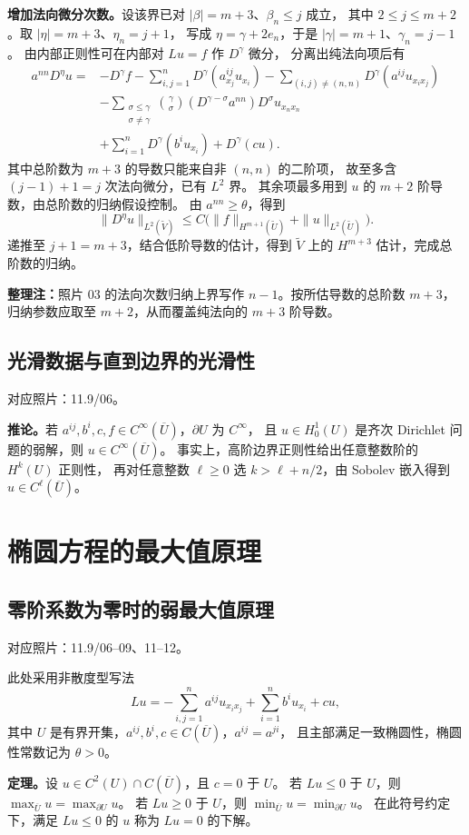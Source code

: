 \documentclass[UTF8,a4paper,11pt,fontset=fandol]{ctexart}
\newcommand{\Ub}{\overline U}
\newcommand{\ednote}[1]{\par{\small\color{notegray}\textbf{整理注：}#1}\par}
\newcommand{\source}[1]{{\small\color{notegray}对应照片：#1。}\par}
\begin{document}
\textbf{增加法向微分次数。}设该界已对 $|\beta|=m+3$、$\beta_n\le j$ 成立，
其中 $2\le j\le m+2$。取 $|\eta|=m+3$、$\eta_n=j+1$，
写成 $\eta=\gamma+2e_n$，于是 $|\gamma|=m+1$、$\gamma_n=j-1$。
由内部正则性可在内部对 $Lu=f$ 作 $D^\gamma$ 微分，
分离出纯法向项后有
\[
\begin{aligned}
a^{nn}D^\eta u={}&-D^\gamma f
-\sum_{i,j=1}^n D^\gamma(a^{ij}_{x_j}u_{x_i})
-\sum_{(i,j)\ne(n,n)}D^\gamma(a^{ij}u_{x_ix_j})\\
&-\sum_{\substack{\sigma\le\gamma\\\sigma\ne\gamma}}
\binom\gamma\sigma(D^{\gamma-\sigma}a^{nn})D^\sigma u_{x_nx_n}\\
&+\sum_{i=1}^nD^\gamma(b^iu_{x_i})+D^\gamma(cu).
\end{aligned}
\]
其中总阶数为 $m+3$ 的导数只能来自非 $(n,n)$ 的二阶项，
故至多含 $(j-1)+1=j$ 次法向微分，已有 $L^2$ 界。
其余项最多用到 $u$ 的 $m+2$ 阶导数，由总阶数的归纳假设控制。
由 $a^{nn}\ge\theta$，得到
\[
\|D^\eta u\|_{L^2(\widetilde V)}
\le C\bigl(\|f\|_{H^{m+1}(\widetilde U)}+\|u\|_{L^2(\widetilde U)}\bigr).
\]
递推至 $j+1=m+3$，结合低阶导数的估计，得到 $\widetilde V$ 上的
$H^{m+3}$ 估计，完成总阶数的归纳。
\ednote{照片 03 的法向次数归纳上界写作 $n-1$。按所估导数的总阶数 $m+3$，归纳参数应取至 $m+2$，从而覆盖纯法向的 $m+3$ 阶导数。}

\newpage
\subsection{光滑数据与直到边界的光滑性}
\source{11.9/06}
\textbf{推论。}若 $a^{ij},b^i,c,f\in C^\infty(\Ub)$，$\partial U$ 为 $C^\infty$，
且 $u\in H_0^1(U)$ 是齐次 Dirichlet 问题的弱解，则 $u\in C^\infty(\Ub)$。
事实上，高阶边界正则性给出任意整数阶的 $H^k(U)$ 正则性，
再对任意整数 $\ell\ge0$ 选 $k>\ell+n/2$，由 Sobolev 嵌入得到
$u\in C^\ell(\Ub)$。

\section{椭圆方程的最大值原理}
\subsection{零阶系数为零时的弱最大值原理}
\source{11.9/06--09、11--12}
此处采用非散度型写法
\[
Lu=-\sum_{i,j=1}^na^{ij}u_{x_ix_j}
   +\sum_{i=1}^nb^iu_{x_i}+cu,
\]
其中 $U$ 是有界开集，$a^{ij},b^i,c\in C(\Ub)$，$a^{ij}=a^{ji}$，
且主部满足一致椭圆性，椭圆性常数记为 $\theta>0$。

\textbf{定理。}设 $u\in C^2(U)\cap C(\Ub)$，且 $c=0$ 于 $U$。
若 $Lu\le0$ 于 $U$，则 $\max_{\Ub}u=\max_{\partial U}u$。
若 $Lu\ge0$ 于 $U$，则 $\min_{\Ub}u=\min_{\partial U}u$。
在此符号约定下，满足 $Lu\le0$ 的 $u$ 称为 $Lu=0$ 的下解。
\end{document}
